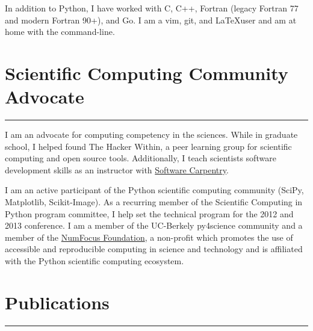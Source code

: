 \documentclass[letterpaper,11pt]{article}
\newcommand{\sectionline}{\vspace{-0.05in}\hrule\vspace{0.05in}}
\begin{document}
In addition to Python, I have worked with C, C++, Fortran (legacy Fortran 77
and modern Fortran 90+), and Go.  I am a vim, git, and \LaTeX user and am at
home with the command-line.


\section*{Scientific Computing Community Advocate}
\sectionline
I am an advocate for computing competency in the sciences.  While in graduate
school, I helped found The Hacker Within, a peer learning group for scientific
computing and open source tools.  Additionally, I teach scientists software
development skills as an instructor with
\hyperref[http://software-carpentry.org/]{Software Carpentry}.

I am an active participant of the Python scientific computing community
(SciPy, Matplotlib, Scikit-Image).   As a
recurring member of the Scientific Computing in Python program committee, I help set the technical program for the 2012 and 2013 conference.  I am a member of the UC-Berkely py4science
community and a member of the \hyperref[numfocus.org]{NumFocus Foundation}, a non-profit which promotes the use of
accessible and reproducible computing in science and technology and is affiliated with the Python
scientific computing ecosystem.



\pagebreak

\section*{Publications}
\hrule
\vspace{0.05in}





\end{document}
